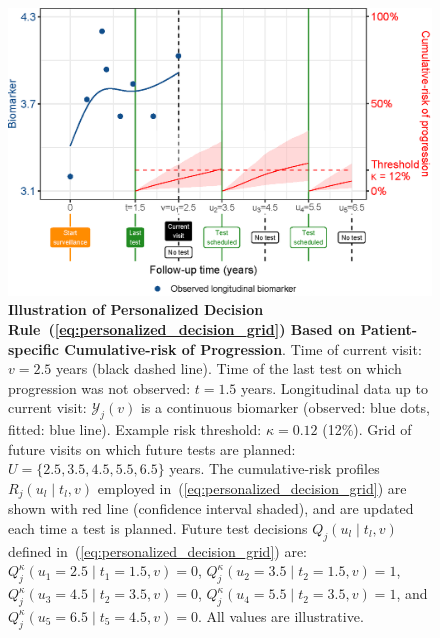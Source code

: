 \begin{figure}
\centerline{\includegraphics{images/schedule_explanation_102.eps}}
\caption{\textbf{Illustration of Personalized Decision Rule~(\ref{eq:personalized_decision_grid}) Based on Patient-specific Cumulative-risk of Progression}. Time of current visit: $v=2.5$ years (black dashed line). Time of the last test on which progression was not observed: $t=1.5$ years. Longitudinal data up to current visit: $\mathcal{Y}_j(v)$ is a continuous biomarker (observed: blue dots, fitted: blue line). Example risk threshold: $\kappa=0.12$ (12\%). Grid of future visits on which future tests are planned: $U = \{2.5, 3.5, 4.5, 5.5, 6.5\}$ years. The cumulative-risk profiles $R_j(u_l \mid t_l, v)$ employed in~(\ref{eq:personalized_decision_grid}) are shown with red line (confidence interval shaded), and are updated each time a test is planned. Future test decisions $Q_j(u_l \mid t_l, v)$ defined in~(\ref{eq:personalized_decision_grid}) are: $Q_j^\kappa(u_1=2.5\mid t_1=1.5,v)=0$, $Q_j^\kappa(u_2=3.5\mid t_2=1.5,v)=1$, $Q_j^\kappa(u_3=4.5\mid t_2=3.5,v)=0$, $Q_j^\kappa(u_4=5.5\mid t_2=3.5,v)=1$, and $Q_j^\kappa(u_5=6.5\mid t_5=4.5,v)=0$. All values are illustrative.} 
\label{fig:schedule_explanation}
\end{figure}

